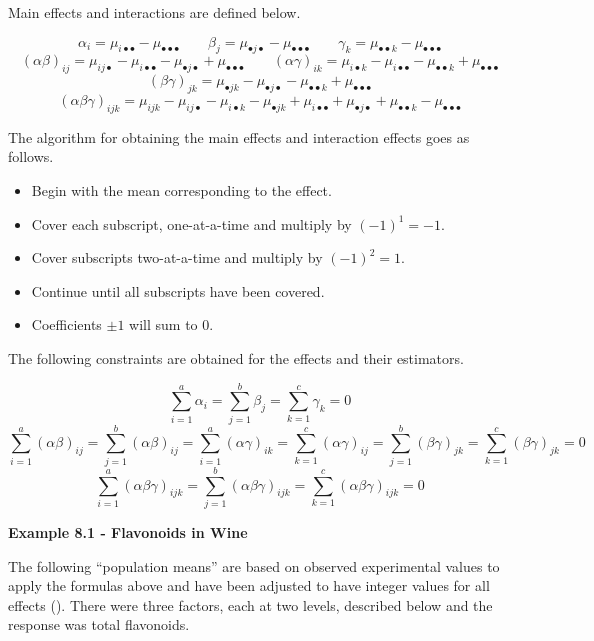 \documentclass[
]{book}
\providecommand{\tightlist}{%
  \setlength{\itemsep}{0pt}\setlength{\parskip}{0pt}}
\begin{document}
Main effects and interactions are defined below.

\[
\alpha_i = \mu_{i\bullet\bullet}-\mu_{\bullet\bullet\bullet} \qquad
\beta_j = \mu_{\bullet j\bullet}-\mu_{\bullet\bullet\bullet} \qquad
\gamma_k = \mu_{\bullet\bullet k}-\mu_{\bullet\bullet\bullet} 
\] \[
(\alpha\beta)_{ij}=\mu_{ij\bullet}-\mu_{i\bullet\bullet}-
\mu_{\bullet j\bullet} + \mu_{\bullet\bullet\bullet} \qquad
(\alpha\gamma)_{ik}=\mu_{i\bullet k}-\mu_{i\bullet\bullet}-
\mu_{\bullet\bullet k} + \mu_{\bullet\bullet\bullet}
\] \[
(\beta\gamma)_{jk}=\mu_{\bullet jk}-\mu_{\bullet j \bullet}-
\mu_{\bullet\bullet k} + \mu_{\bullet\bullet\bullet}
\] \[
(\alpha\beta\gamma)_{ijk}=\mu_{ijk}-\mu_{ij\bullet}-\mu_{i\bullet k}-
\mu_{\bullet jk} + \mu_{i\bullet\bullet} + \mu_{\bullet j\bullet} +
\mu_{\bullet\bullet k} - \mu_{\bullet\bullet\bullet}
\]

The algorithm for obtaining the main effects and interaction effects
goes as follows.

\begin{itemize}
\tightlist
\item
  Begin with the mean corresponding to the effect.
\item
  Cover each subscript, one-at-a-time and multiply by \((-1)^1=-1\).
\item
  Cover subscripts two-at-a-time and multiply by \((-1)^2=1\).
\item
  Continue until all subscripts have been covered.
\item
  Coefficients \(\pm 1\) will sum to 0.
\end{itemize}

The following constraints are obtained for the effects and their
estimators.

\[
\sum_{i=1}^a\alpha_i=\sum_{j=1}^b\beta_j=\sum_{k=1}^c\gamma_k=0
\] \[
\sum_{i=1}^a(\alpha\beta)_{ij}=\sum_{j=1}^b(\alpha\beta)_{ij}=
\sum_{i=1}^a(\alpha\gamma)_{ik}=\sum_{k=1}^c(\alpha\gamma)_{ij}=
\sum_{j=1}^b(\beta\gamma)_{jk}=\sum_{k=1}^c(\beta\gamma)_{jk}=0
\] \[
\sum_{i=1}^a(\alpha\beta\gamma)_{ijk}=
\sum_{j=1}^b(\alpha\beta\gamma)_{ijk}=
\sum_{k=1}^c(\alpha\beta\gamma)_{ijk}=0
\]

\textbf{Example 8.1 - Flavonoids in Wine}

The following ``population means'' are based on observed experimental
values to apply the formulas above and have been adjusted to have
integer values for all effects (). There were three factors, each at two levels, described below
and the response was total flavonoids.
\end{document}
